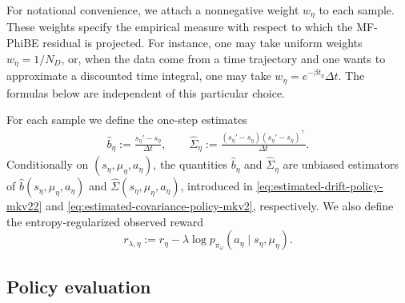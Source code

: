 \documentclass[a4paper, 10pt, english, reqno]{amsart}
\begin{document}
For notational convenience, we attach a nonnegative weight $w_\eta$ to
each sample. These weights specify the empirical measure with respect to
which the MF-PhiBE residual is projected. For instance, one may take
uniform weights $w_\eta=1/N_D$, or, when the data come from a time
trajectory and one wants to approximate a discounted time integral, one
may take $w_\eta=e^{-\beta t_\eta}\Delta t$. The formulas below are
independent of this particular choice. 

For each sample we define the one-step estimates
\begin{align}
\label{eq:coef_est}
     \widehat b_\eta
  :=
  \frac{s_\eta'-s_\eta}{\Delta t},
  \qquad
  \widehat\Sigma_\eta
  :=
  \frac{(s_\eta'-s_\eta)(s_\eta'-s_\eta)^\top}{\Delta t}.
\end{align}
Conditionally on $(s_\eta,\mu_\eta,a_\eta)$, the quantities
$\widehat b_\eta$ and $\widehat\Sigma_\eta$ are unbiased estimators of
$\hat b(s_\eta,\mu_\eta,a_\eta)$ and
$\hat\Sigma(s_\eta,\mu_\eta,a_\eta)$, introduced in
\eqref{eq:estimated-drift-policy-mkv22} and
\eqref{eq:estimated-covariance-policy-mkv2}, respectively. We also
define the entropy-regularized observed reward
\[
  r_{\lambda,\eta}
  :=
  r_\eta
  -
  \lambda\log p_{\pi_\omega}(a_\eta\mid s_\eta,\mu_\eta).
\]\subsection{Policy evaluation}
\label{subsec:critic-algorithm}
\end{document}
